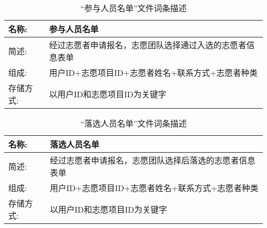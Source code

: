 \begin{table}[H]
  \begin{center}
    \caption{“参与人员名单”文件词条描述}
    \begin{tabular}{l p{10cm}} 
      \hline
      名称: & 参与人员名单\\
      \hline
      简述: &  经过志愿者申请报名，志愿团队选择通过入选的志愿者信息表单\\
      \hline
      组成: &  用户ID+志愿项目ID+志愿者姓名+联系方式+志愿者种类\\
      \hline
      存储方式: &  以用户ID和志愿项目ID为关键字\\
      \hline
    \end{tabular}
    \label{志愿项目信息表}
  \end{center}
\end{table}

\begin{table}[H]
  \begin{center}
    \caption{“落选人员名单”文件词条描述}
    \begin{tabular}{l p{10cm}} 
      \hline
      名称: & 落选人员名单\\
      \hline
      简述: &  经过志愿者申请报名，志愿团队选择后落选的志愿者信息表单\\
      \hline
      组成: &  用户ID+志愿项目ID+志愿者姓名+联系方式+志愿者种类\\
      \hline
      存储方式: &  以用户ID和志愿项目ID为关键字\\
      \hline
    \end{tabular}
    \label{志愿项目信息表}
  \end{center}
\end{table}